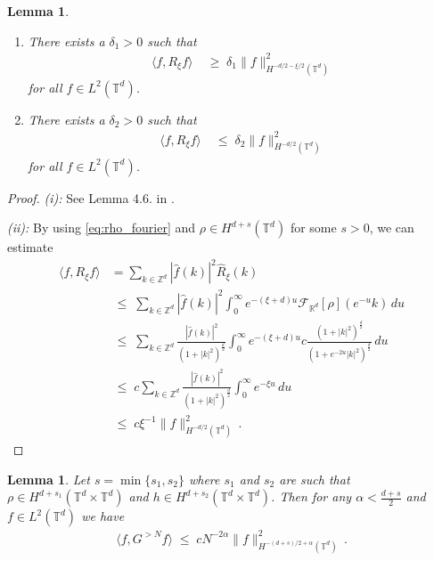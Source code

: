 \documentclass[11pt]{article}
\numberwithin{equation}{section}
\newtheorem{lemma}[theorem]{Lemma}
\theoremstyle{definition}
\renewcommand{\leq}{\;\leqslant\;}                   %
\renewcommand{\geq}{\;\geqslant\;}                   %
\newcommand{\R}{\mathbb{R}}
\newcommand{\Z}{\mathbb{Z}}
\def\T{\mathbb{T}}
\begin{document}
\begin{lemma}\label{lem:R_bounds}
\begin{enumerate}
\item[(i)] There exists a $\delta_1 > 0$ such that
\begin{align*}
\langle f, R_\xi f \rangle & \geq \delta_1 \|f\|_{H^{-d/2-\xi/2}(\T^d)}^2
\end{align*}
for all $f \in L^2(\T^d)$.

\item[(ii)] There exists a $\delta_2 > 0$ such that
\begin{align*}
\langle f, R_\xi f \rangle & \leq \delta_2 \|f\|_{H^{-d/2}(\T^d)}^2
\end{align*}
for all $f \in L^2(\T^d)$.
\end{enumerate}
\end{lemma}


\begin{proof}
\emph{(i):} See Lemma 4.6. in \cite{JSW}.

\emph{(ii):} By using \eqref{eq:rho_fourier} and $\rho \in H^{d+s}(\T^d)$ for some $s >0$, we can estimate
\begin{align*}
\langle f, R_\xi f \rangle &=\sum_{k \in \Z^d} |\hat f(k)|^2 \hat R_\xi(k) \\
& \leq \sum_{k \in \Z^d} |\hat f(k)|^2 \int_0^\infty e^{-(\xi + d) u} \mathcal{F}_{\R^d}[\rho](e^{-u} k) \, du \\
& \leq \sum_{k \in \Z^d} \frac{|\hat f(k)|^2}{(1+|k|^2)^{\frac{d}{2}}}  \int_0^\infty e^{-(\xi+d) u} c \frac{(1+|k|^2)^{\frac{d}{2}}}{(1+ e^{-2u} |k|^2)^{ \frac{d}{2}}} \, du \\
& \leq c\sum_{k \in \Z^d} \frac{|\hat f(k)|^2}{(1+|k|^2)^{\frac{d}{2}}} \int_0^\infty e^{-\xi u} \, du  \\
& \leq c\xi^{-1} \|f\|_{H^{-d/2}(\T^d)}^2 \,.
\end{align*}
\end{proof}







\begin{lemma}\label{lem:G_bound}
Let $s = \min\{s_1,s_2\}$ where $s_1$ and $s_2$ are such that $\rho \in H^{d+s_1}(\T^d \times \T^d)$ and $h \in H^{d+s_2}(\T^d \times \T^d)$. Then for any $\alpha < \frac{d+s}{2}$  and $f \in L^2(\T^d)$ we have
\begin{align*}
\langle f, G^{>N} f \rangle \leq c  N^{-2\alpha}  \|f\|^2_{H^{-(d+s)/2+\alpha}(\T^d)}\,.
\end{align*}
\end{lemma}
\end{document}
